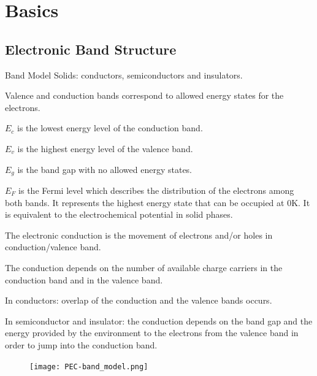 \documentclass[10pt,compress,handout]{beamer}
\begin{document}
\section{Basics}
\subsection{Electronic Band Structure}
    \begin{frame}[allowframebreaks=1.0]{Band Model}
        Solids: conductors, semiconductors and insulators. 
        
        Valence and conduction bands correspond to allowed energy states for the electrons. 
        
        $E_c$ is the lowest energy level of the conduction band.
        
        $E_v$ is the highest energy level of the valence band.
        
        $E_g$ is the band gap with no allowed energy states. 
        
        $E_F$ is the Fermi level which describes the distribution of the electrons among both bands.
        It represents the highest energy state that can be occupied at 0K. 
        It is equivalent to the electrochemical potential in solid phases.
        
        \framebreak
        The electronic conduction is the movement of electrons and/or holes in conduction/valence band.

        The conduction depends on the number of available charge carriers
        in the conduction band and in the valence band. 
        
        In conductors: overlap of the conduction and the valence bands occurs. 
        
        In semiconductor and insulator: the conduction depends on the band gap and the energy provided by 
        the environment to the electrons from the valence band in order to jump 
        into the conduction band.

        \begin{figure}[h]
            \centering
                \texttt{[image: PEC-band\_model.png]}
            \label{fig_band_model}
        \end{figure}
    \end{frame}
\end{document}
